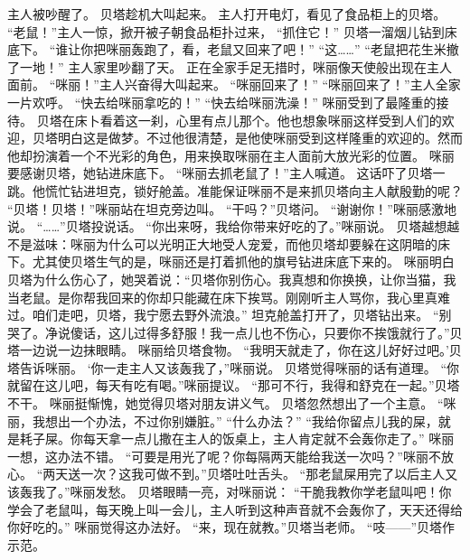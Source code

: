 \documentclass[a4paper,12pt,UTF8,twoside]{ctexbook}
\begin{document}
        主人被吵醒了。 
        贝塔趁机大叫起来。 
        主人打开电灯，看见了食品柜上的贝塔。 
        “老鼠！”主人一惊，掀开被子朝食品柜扑过来， 
        “抓住它！” 
        贝塔一溜烟儿钻到床底下。 
        “谁让你把咪丽轰跑了，看，老鼠又回来了吧！” 
        “这……” 
        “老鼠把花生米撤了一地！” 
        主人家里吵翻了天。 
        正在全家手足无措时，咪丽像天使般出现在主人面前。 
        “咪丽！”主人兴奋得大叫起来。 
        “咪丽回来了！” 
        “咪丽回来了！”主人全家一片欢呼。 
        “快去给咪丽拿吃的！” 
        “快去给咪丽洗澡！” 
        咪丽受到了最隆重的接待。 
        贝塔在床卜看着这一刹，心里有点儿那个。他也想象咪丽这样受到人们的欢迎，贝塔明白这是做梦。不过他很清楚，是他使咪丽受到这样隆重的欢迎的。然而他却扮演着一个不光彩的角色，用来换取咪丽在主人面前大放光彩的位置。 
        咪丽要感谢贝塔，她钻进床底下。 
        “咪丽去抓老鼠了！”主人喊道。 
        这话吓了贝塔一跳。他慌忙钻进坦克，锁好舱盖。准能保证咪丽不是来抓贝塔向主人献殷勤的呢？ 
        “贝塔！贝塔！”咪丽站在坦克旁边叫。 
        “干吗？”贝塔问。 
        “谢谢你！”咪丽感激地说。 
        “……”贝塔投说话。 
        “你出来呀，我给你带来好吃的了。”咪丽说。 
        贝塔越想越不是滋味：咪丽为什么可以光明正大地受人宠爱，而他贝塔却要躲在这阴暗的床下。尤其使贝塔生气的是，咪丽还是打着抓他的旗号钻进床底下来的。 
        咪丽明白贝塔为什么伤心了，她哭着说：“贝塔你别伤心。我真想和你换换，让你当猫，我当老鼠。是你帮我回来的你却只能藏在床下挨骂。刚刚听主人骂你，我心里真难过。咱们走吧，贝塔，我宁愿去野外流浪。” 
        坦克舱盖打开了，贝塔钻出来。 
        “别哭了。净说傻话，这儿过得多舒服！我一点儿也不伤心，只要你不挨饿就行了。”贝塔一边说一边抹眼睛。 
        咪丽给贝塔食物。 
        “我明天就走了，你在这儿好好过吧。’贝塔告诉咪丽。 
        ‘你一走主人又该轰我了，”咪丽说。 
        贝塔觉得咪丽的话有道理。 
        “你就留在这儿吧，每天有吃有喝。”咪丽提议。 
        “那可不行，我得和舒克在一起。”贝塔不干。 
        咪丽挺惭愧，她觉得贝塔对朋友讲义气。 
        贝塔忽然想出了一个主意。 
        “咪丽，我想出一个办法，不过你别嫌脏。” 
        “什么办法？” 
        “我给你留点儿我的屎，就是耗子屎。你每天拿一点儿撒在主人的饭桌上，主人肯定就不会轰你走了。” 
        咪丽一想，这办法不错。 
        “可要是用光了呢？你每隔两天能给我送一次吗？”咪丽不放心。 
        “两天送一次？这我可做不到。”贝塔吐吐舌头。 
        “那老鼠屎用完了以后主人又该轰我了。”咪丽发愁。 
        贝塔眼睛一亮，对咪丽说：  “干脆我教你学老鼠叫吧！你学会了老鼠叫，每天晚上叫一会儿，主人听到这种声音就不会轰你了，天天还得给你好吃的。” 
        咪丽觉得这办法好。 
        “来，现在就教。”贝塔当老师。 
        “吱——”贝塔作示范。 
\end{document}
